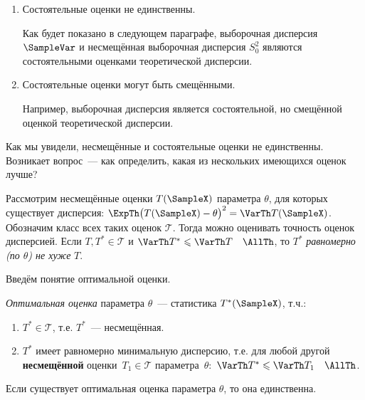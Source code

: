 \begin{rmrk}
\begin{enumerate}
    \item Состоятельные оценки не единственны.
    
    Как будет показано в следующем параграфе, выборочная дисперсия $\SampleVar$ и несмещённая выборочная дисперсия $S_0^{2}$ являются состоятельными оценками теоретической дисперсии.
    
    \item Состоятельные оценки могут быть смещёнными.
    
    Например, выборочная дисперсия является состоятельной, но смещённой оценкой теоретической дисперсии.
    
    \end{enumerate}
\end{rmrk}

Как мы увидели, несмещённые и состоятельные оценки не единственны.
Возникает вопрос~--- как определить, какая из нескольких имеющихся оценок лучше?

Рассмотрим несмещённые оценки $T(\SampleX)$ параметра $\theta$, для которых существует дисперсия: $\ExpTh \bigl(T(\SampleX)-\theta\bigr)^{2}=\VarTh T(\SampleX)$.
Обозначим класс всех таких оценок $\mathcal{T}$.
Тогда можно оценивать точность оценок дисперсией.
Если $T, T^* \in \mathcal{T}$ и $\VarTh T^* \leqslant \VarTh T \quad \AllTh$, то $T^*$ \textit{равномерно (по $\theta$) не хуже} $T$.

Введём понятие оптимальной оценки.
\begin{defn}
    \textit{Оптимальная оценка} параметра $\theta$~--- статистика $T^*(\SampleX)$, т.ч.:
    \begin{enumerate}
        \item $T^* \in \mathcal{T}$, т.е. $T^*$~--- несмещённая.
        \item $T^*$ имеет равномерно минимальную дисперсию, т.е. для любой другой \textbf{несмещённой} оценки~$T_{1} \in \mathcal{T}$ параметра~$\theta \colon$ ${\VarTh T^* \leqslant \VarTh T_{1}} \quad {\AllTh}$.
    \end{enumerate}
\end{defn}

\vspace{5mm}
\begin{thm*}
    Если существует оптимальная оценка параметра $\theta$, то она единственна.
\end{thm*}

